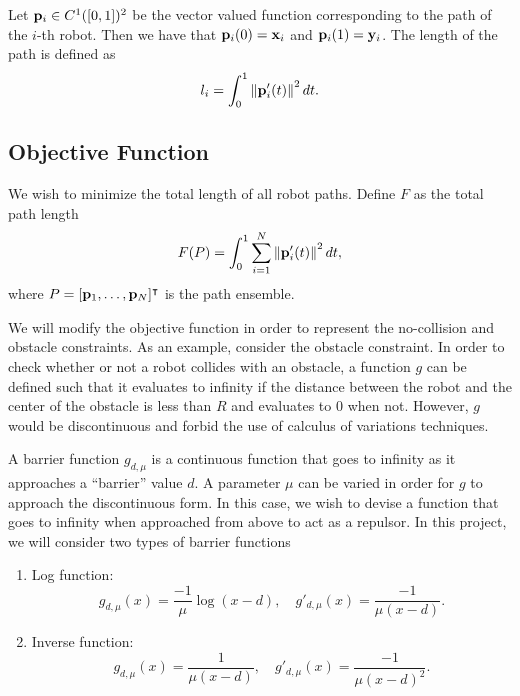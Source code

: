 \documentclass[11pt]{article}
\begin{document}
Let \(\mathbf{p}_i \in C^1([0,1])^2\) be the vector valued function corresponding to the path of the \(i\)-th robot. Then we have that \(\mathbf{p}_i(0) = \mathbf{x}_i\) and \(\mathbf{p}_i(1) = \mathbf{y}_i\). The length of the path is defined as
\begin{equation}
    l_i = \int_0^1 \left\lVert \mathbf{p}_i'(t) \right\rVert^2 dt.
\end{equation}

\subsection{Objective Function}

We wish to minimize the total length of all robot paths. Define \(F\) as the total path length
\begin{equation}
    F(P) = \int_0^1 \sum_{i=1}^{N} \left\lVert \mathbf{p}_i'(t) \right\rVert^2 dt,
\end{equation}
where \(P = [\mathbf{p}_1, \ldots, \mathbf{p}_N]^\intercal\) is the path ensemble.

We will modify the objective function in order to represent the no-collision and obstacle constraints. As an example, consider the obstacle constraint. In order to check whether or not a robot collides with an obstacle, a function \(g\) can be defined such that it evaluates to infinity if the distance between the robot and the center of the obstacle is less than \(R\) and evaluates to 0 when not. However, \(g\) would be discontinuous and forbid the use of calculus of variations techniques.

A barrier function \(g_{d,\mu}\) is a continuous function that goes to infinity as it approaches a ``barrier'' value \(d\). A parameter \(\mu\) can be varied in order for \(g\) to approach the discontinuous form. In this case, we wish to devise a function that goes to infinity when approached from above to act as a repulsor. In this project, we will consider two types of barrier functions
\begin{enumerate}
    \item Log function:
    \begin{equation}
        g_{d,\mu}(x) = \frac{-1}{\mu} \log(x-d),
        \quad
        g'_{d,\mu}(x) = \frac{-1}{\mu(x-d)}.
    \end{equation}
    \item Inverse function:
    \begin{equation}
        g_{d,\mu}(x) = \frac{1}{\mu(x-d)},
        \quad
        g'_{d,\mu}(x) = \frac{-1}{\mu(x-d)^2}.
    \end{equation}
\end{enumerate}
\end{document}
